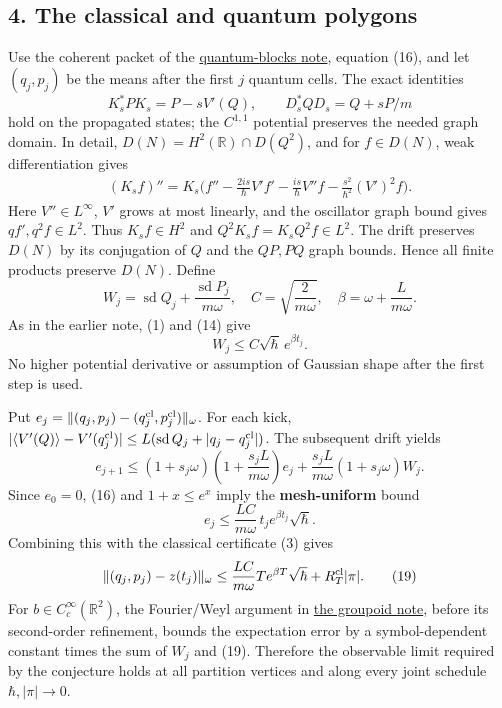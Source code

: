 \documentclass[11pt,a4paper]{article}
\begin{document}
\subsection{4. The classical and quantum
polygons}\label{the-classical-and-quantum-polygons}

Use the coherent packet of the
\href{quantum-blocks-construct-newton.md}{quantum-blocks note}, equation
(16), and let \((q_j,p_j)\) be the means after the first \(j\) quantum
cells. The exact identities \[
 K_s^*PK_s=P-sV'(Q),\qquad D_s^*QD_s=Q+sP/m\tag{14}
\] hold on the propagated states; the \(C^{1,1}\) potential preserves
the needed graph domain. In detail, \(D(N)=H^2(\mathbb R)\cap D(Q^2)\),
and for \(f\in D(N)\), weak differentiation gives \[
 \begin{aligned}
 (K_s f)''=K_s\bigg(f''-\frac{2is}{\hbar}V'f'
 -\frac{is}{\hbar}V''f-\frac{s^2}{\hbar^2}(V')^2f\bigg).
 \end{aligned}\tag{14a}
\] Here \(V''\in L^\infty\), \(V'\) grows at most linearly, and the
oscillator graph bound gives \(qf',q^2f\in L^2\). Thus \(K_s f\in H^2\)
and \(Q^2K_s f=K_sQ^2f\in L^2\). The drift preserves \(D(N)\) by its
conjugation of \(Q\) and the \(QP,PQ\) graph bounds. Hence all finite
products preserve \(D(N)\). Define \[
 W_j=\operatorname{sd}Q_j+\frac{\operatorname{sd}P_j}{m\omega},
 \quad C=\sqrt{\frac2{m\omega}},\quad
 \beta=\omega+\frac{L}{m\omega}.\tag{15}
\] As in the earlier note, (1) and (14) give
\[W_j\le C\sqrt\hbar\,e^{\beta t_j}.\tag{16}\] No higher potential
derivative or assumption of Gaussian shape after the first step is used.

Put \(e_j=\|(q_j,p_j)-(q_j^{\rm cl},p_j^{\rm cl})\|_\omega\). For each
kick, \(|\langle V'(Q)\rangle-V'(q_j^{\rm cl})|
 \le L(\operatorname{sd}Q_j+|q_j-q_j^{\rm cl}|)\). The subsequent drift
yields \[
 e_{j+1}\le
 (1+s_j\omega)\!\left(1+\frac{s_jL}{m\omega}\right)e_j
 +\frac{s_jL}{m\omega}(1+s_j\omega)W_j.\tag{17}
\] Since \(e_0=0\), (16) and \(1+x\le e^x\) imply the
\textbf{mesh-uniform} bound \[
 e_j\le \frac{LC}{m\omega}\,t_j e^{\beta t_j}\sqrt\hbar.
 \tag{18}
\] Combining this with the classical certificate (3) gives \[
 \|(q_j,p_j)-z(t_j)\|_\omega
 \le \frac{LC}{m\omega}T e^{\beta T}\sqrt\hbar
       +R_T^{\rm cl}|\pi|.\tag{19}
\] For \(b\in C_c^\infty(\mathbb R^2)\), the Fourier/Weyl argument in
\href{groupoid-quantum-newton-states.md}{the groupoid note}, before its
second-order refinement, bounds the expectation error by a
symbol-dependent constant times the sum of \(W_j\) and (19). Therefore
the observable limit required by the conjecture holds at all partition
vertices and along every joint schedule \(\hbar,|\pi|\to0\).
\end{document}
